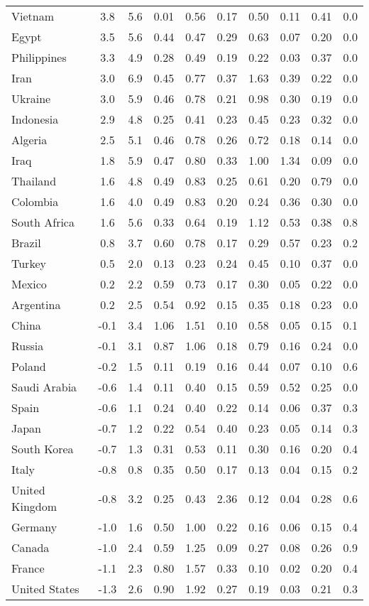 \begin{tabular}[t]{lccccccccc}
Vietnam & 3.8 & 5.6 & 0.01 & 0.56 & 0.17 & 0.50 & 0.11 & 0.41 & 0.0\\
Egypt & 3.5 & 5.6 & 0.44 & 0.47 & 0.29 & 0.63 & 0.07 & 0.20 & 0.0\\
Philippines & 3.3 & 4.9 & 0.28 & 0.49 & 0.19 & 0.22 & 0.03 & 0.37 & 0.0\\
Iran & 3.0 & 6.9 & 0.45 & 0.77 & 0.37 & 1.63 & 0.39 & 0.22 & 0.0\\
Ukraine & 3.0 & 5.9 & 0.46 & 0.78 & 0.21 & 0.98 & 0.30 & 0.19 & 0.0\\
Indonesia & 2.9 & 4.8 & 0.25 & 0.41 & 0.23 & 0.45 & 0.23 & 0.32 & 0.0\\
Algeria & 2.5 & 5.1 & 0.46 & 0.78 & 0.26 & 0.72 & 0.18 & 0.14 & 0.0\\
Iraq & 1.8 & 5.9 & 0.47 & 0.80 & 0.33 & 1.00 & 1.34 & 0.09 & 0.0\\
Thailand & 1.6 & 4.8 & 0.49 & 0.83 & 0.25 & 0.61 & 0.20 & 0.79 & 0.0\\
Colombia & 1.6 & 4.0 & 0.49 & 0.83 & 0.20 & 0.24 & 0.36 & 0.30 & 0.0\\
South Africa & 1.6 & 5.6 & 0.33 & 0.64 & 0.19 & 1.12 & 0.53 & 0.38 & 0.8\\
Brazil & 0.8 & 3.7 & 0.60 & 0.78 & 0.17 & 0.29 & 0.57 & 0.23 & 0.2\\
Turkey & 0.5 & 2.0 & 0.13 & 0.23 & 0.24 & 0.45 & 0.10 & 0.37 & 0.0\\
Mexico & 0.2 & 2.2 & 0.59 & 0.73 & 0.17 & 0.30 & 0.05 & 0.22 & 0.0\\
Argentina & 0.2 & 2.5 & 0.54 & 0.92 & 0.15 & 0.35 & 0.18 & 0.23 & 0.0\\
China & -0.1 & 3.4 & 1.06 & 1.51 & 0.10 & 0.58 & 0.05 & 0.15 & 0.1\\
Russia & -0.1 & 3.1 & 0.87 & 1.06 & 0.18 & 0.79 & 0.16 & 0.24 & 0.0\\
Poland & -0.2 & 1.5 & 0.11 & 0.19 & 0.16 & 0.44 & 0.07 & 0.10 & 0.6\\
Saudi Arabia & -0.6 & 1.4 & 0.11 & 0.40 & 0.15 & 0.59 & 0.52 & 0.25 & 0.0\\
Spain & -0.6 & 1.1 & 0.24 & 0.40 & 0.22 & 0.14 & 0.06 & 0.37 & 0.3\\
Japan & -0.7 & 1.2 & 0.22 & 0.54 & 0.40 & 0.23 & 0.05 & 0.14 & 0.3\\
South Korea & -0.7 & 1.3 & 0.31 & 0.53 & 0.11 & 0.30 & 0.16 & 0.20 & 0.4\\
Italy & -0.8 & 0.8 & 0.35 & 0.50 & 0.17 & 0.13 & 0.04 & 0.15 & 0.2\\
United Kingdom & -0.8 & 3.2 & 0.25 & 0.43 & 2.36 & 0.12 & 0.04 & 0.28 & 0.6\\
Germany & -1.0 & 1.6 & 0.50 & 1.00 & 0.22 & 0.16 & 0.06 & 0.15 & 0.4\\
Canada & -1.0 & 2.4 & 0.59 & 1.25 & 0.09 & 0.27 & 0.08 & 0.26 & 0.9\\
France & -1.1 & 2.3 & 0.80 & 1.57 & 0.33 & 0.10 & 0.02 & 0.20 & 0.4\\
United States & -1.3 & 2.6 & 0.90 & 1.92 & 0.27 & 0.19 & 0.03 & 0.21 & 0.3\\
\bottomrule
\end{tabular}